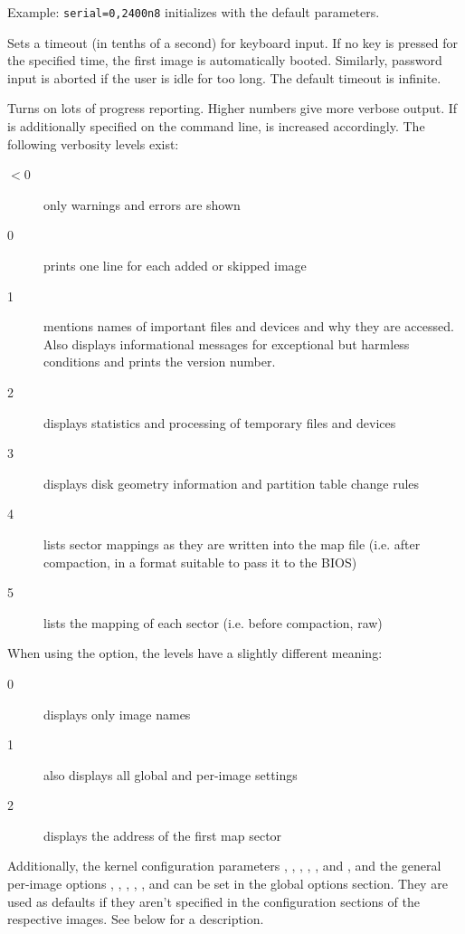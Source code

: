 \begin{description}
    Example: \verb"serial=0,2400n8" initializes  with the
    default parameters.
  \item[\craw{timeout=}\meta{tsecs}] Sets a timeout (in tenths of a second) for
    keyboard input. If no key is pressed for the specified time, the first
    image is automatically booted. Similarly, password input is aborted if
    the user is idle for too long. The default timeout is infinite.
  \item[\craw{verbose=}\meta{level}] Turns on lots of progress reporting.
    Higher numbers give more verbose output. If  is additionally
    specified on the command line,  is increased accordingly.
    The following verbosity levels exist:
    \begin{description}
      \item[$<$0] only warnings and errors are shown
      \item[0] prints one line for each added or skipped image
      \item[1] mentions names of important files and devices and why they
	are accessed. Also displays informational messages for exceptional
	but harmless conditions and prints the version number.
      \item[2] displays statistics and processing of temporary files and
        devices
      \item[3] displays disk geometry information and partition table change
	rules
      \item[4] lists sector mappings as they are written into the map file
	(i.e. after compaction, in a format suitable to pass it to the BIOS)
      \item[5] lists the mapping of each sector (i.e. before compaction, raw)
    \end{description}
    When using the  option, the levels have a slightly different
    meaning:
    \begin{description}
      \item[0] displays only image names
      \item[1] also displays all global and per-image settings
      \item[2] displays the address of the first map sector
    \end{description}
\end{description}

Additionally, the kernel configuration parameters , ,
, , ,  and
, and the general per-image options , ,
, , , and
 can be set in
the global options section. They are used as defaults if they aren't specified
in the configuration sections of the respective images. See below for a
description.

